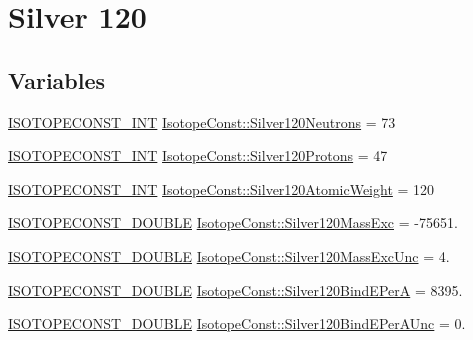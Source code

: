 \hypertarget{group___isotope_const-_silver-_ag120}{}\section{Silver 120}
\label{group___isotope_const-_silver-_ag120}
\subsection*{Variables}
\begin{DoxyCompactItemize}
\item 
\mbox{\hyperlink{group___isotope_const-_macros_ga5f18360b3e99483a35c32d789e62621c}{I\+S\+O\+T\+O\+P\+E\+C\+O\+N\+S\+T\+\_\+\+I\+NT}} \mbox{\hyperlink{group___isotope_const-_silver-_ag120_ga2030189cc6272a1954b48fc38c5cc3f9}{Isotope\+Const\+::\+Silver120\+Neutrons}} = 73
\item 
\mbox{\hyperlink{group___isotope_const-_macros_ga5f18360b3e99483a35c32d789e62621c}{I\+S\+O\+T\+O\+P\+E\+C\+O\+N\+S\+T\+\_\+\+I\+NT}} \mbox{\hyperlink{group___isotope_const-_silver-_ag120_ga1f7d911527c9b097f6cc288dd23c3936}{Isotope\+Const\+::\+Silver120\+Protons}} = 47
\item 
\mbox{\hyperlink{group___isotope_const-_macros_ga5f18360b3e99483a35c32d789e62621c}{I\+S\+O\+T\+O\+P\+E\+C\+O\+N\+S\+T\+\_\+\+I\+NT}} \mbox{\hyperlink{group___isotope_const-_silver-_ag120_gaa720a226f5f55dfda078c58937e00fa9}{Isotope\+Const\+::\+Silver120\+Atomic\+Weight}} = 120
\item 
\mbox{\hyperlink{group___isotope_const-_macros_ga8f45a7272ce02c0b4c65c44636ed719a}{I\+S\+O\+T\+O\+P\+E\+C\+O\+N\+S\+T\+\_\+\+D\+O\+U\+B\+LE}} \mbox{\hyperlink{group___isotope_const-_silver-_ag120_ga1ad14567f4ea36732f45583ad9b15824}{Isotope\+Const\+::\+Silver120\+Mass\+Exc}} = -\/75651.
\item 
\mbox{\hyperlink{group___isotope_const-_macros_ga8f45a7272ce02c0b4c65c44636ed719a}{I\+S\+O\+T\+O\+P\+E\+C\+O\+N\+S\+T\+\_\+\+D\+O\+U\+B\+LE}} \mbox{\hyperlink{group___isotope_const-_silver-_ag120_ga0403d73e029e5c6c71916e5838277011}{Isotope\+Const\+::\+Silver120\+Mass\+Exc\+Unc}} = 4.
\item 
\mbox{\hyperlink{group___isotope_const-_macros_ga8f45a7272ce02c0b4c65c44636ed719a}{I\+S\+O\+T\+O\+P\+E\+C\+O\+N\+S\+T\+\_\+\+D\+O\+U\+B\+LE}} \mbox{\hyperlink{group___isotope_const-_silver-_ag120_ga9680ff29f4ec06867123a50fa4582a7d}{Isotope\+Const\+::\+Silver120\+Bind\+E\+PerA}} = 8395.
\item 
\mbox{\hyperlink{group___isotope_const-_macros_ga8f45a7272ce02c0b4c65c44636ed719a}{I\+S\+O\+T\+O\+P\+E\+C\+O\+N\+S\+T\+\_\+\+D\+O\+U\+B\+LE}} \mbox{\hyperlink{group___isotope_const-_silver-_ag120_ga9ba5b87cae22e35d60585672b0bb0a22}{Isotope\+Const\+::\+Silver120\+Bind\+E\+Per\+A\+Unc}} = 0.

\end{DoxyCompactItemize}
